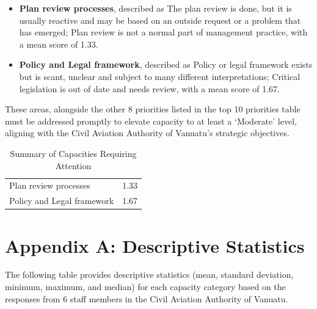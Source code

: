 \documentclass[
  10pt,
]{report}
\providecommand{\tightlist}{%
  \setlength{\itemsep}{0pt}\setlength{\parskip}{0pt}}
\begin{document}
\begin{itemize}
\tightlist
\item
  \textbf{Plan review processes}, described as The plan review is done,
  but it is usually reactive and may be based on an outside request or a
  problem that has emerged; Plan review is not a normal part of
  management practice, with a mean score of 1.33.
\item
  \textbf{Policy and Legal framework}, described as Policy or legal
  framework exists but is scant, unclear and subject to many different
  interpretations; Critical legislation is out of date and needs review,
  with a mean score of 1.67.
\end{itemize}

These areas, alongside the other 8 priorities listed in the top 10
priorities table must be addressed promptly to elevate capacity to at
least a `Moderate' level, aligning with the Civil Aviation Authority of
Vanuatu's strategic objectives.

\begingroup\fontsize{8}{10}\selectfont

\begin{longtable}[t]{>{\raggedright\arraybackslash}p{7cm}r}
\caption{\label{tab:unnamed-chunk-3}Summary of Capacities Requiring Attention}\\
\toprule
\cellcolor[HTML]{006498}{\textcolor{white}{\textbf{Capacity Category}}} & \cellcolor[HTML]{006498}{\textcolor{white}{\textbf{Mean Score}}}\\
\midrule
Plan review processes & 1.33\\
Policy and Legal framework & 1.67\\
\bottomrule
\end{longtable}
\endgroup{}

\chapter{Appendix A: Descriptive
Statistics}\label{appendix-a-descriptive-statistics}

The following table provides descriptive statistics (mean, standard
deviation, minimum, maximum, and median) for each capacity category
based on the responses from 6 staff members in the Civil Aviation
Authority of Vanuatu.

\begingroup\fontsize{8}{10}\selectfont
\end{document}
